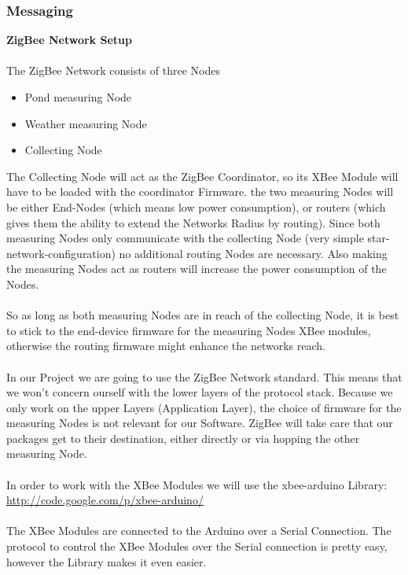 \documentclass[
	11pt,
	a4paper
]{article}%
\begin{document}
\subsubsection{Messaging}
\textbf{ZigBee Network Setup}
\\\\
The ZigBee Network consists of three Nodes
\begin{itemize}
\item Pond measuring Node
\item Weather measuring Node
\item Collecting Node
\end{itemize}
The Collecting Node will act as the ZigBee Coordinator, so its XBee Module will have to be loaded with the coordinator Firmware. the two measuring Nodes will be either End-Nodes (which means low power consumption), or routers (which gives them the ability to extend the Networks Radius by routing). Since both measuring Nodes only communicate with the collecting Node (very simple star-network-configuration) no additional routing Nodes are necessary. Also making the measuring Nodes act as routers will increase the power consumption of the Nodes.
\\\\
So as long as both measuring Nodes are in reach of the collecting Node, it is best to stick to the end-device firmware for the measuring Nodes XBee modules, otherwise the routing firmware might enhance the networks reach.
\\\\
In our Project we are going to use the ZigBee Network standard. This means that we won't concern ourself with the lower layers of the protocol stack. Because we only work on the upper Layers (Application Layer), the choice of firmware for the measuring Nodes is not relevant for our Software. ZigBee will take care that our packages get to their destination, either directly or via hopping the other measuring Node.
\\\\
In order to work with the XBee Modules we will use the xbee-arduino Library:\\ \url{http://code.google.com/p/xbee-arduino/}
\\\\
The XBee Modules are connected to the Arduino over a Serial Connection. The protocol to control the XBee Modules over the Serial connection is pretty easy, however the Library makes it even easier.
\\\\
\end{document}
